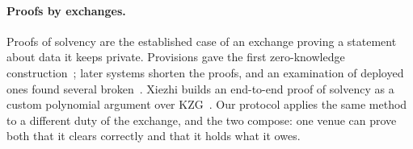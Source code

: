\paragraph{Proofs by exchanges.}
Proofs of solvency are the established case of an exchange proving a statement about data it keeps private. Provisions gave the first zero-knowledge construction~\cite{provisions2015}; later systems shorten the proofs, and an examination of deployed ones found several broken~\cite{chalkias2022}. Xiezhi builds an end-to-end proof of solvency as a custom polynomial argument over KZG~\cite{xiezhi2026}. Our protocol applies the same method to a different duty of the exchange, and the two compose: one venue can prove both that it clears correctly and that it holds what it owes.

